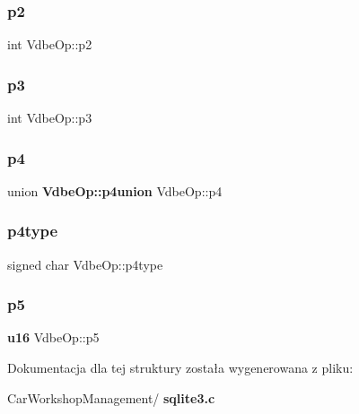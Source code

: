 \subsubsection{p2}
{\footnotesize\ttfamily int Vdbe\+Op\+::p2}

\mbox{\label{struct_vdbe_op_ad7ef3319da20d5423b8cc5da6995d193}} 
\subsubsection{p3}
{\footnotesize\ttfamily int Vdbe\+Op\+::p3}

\mbox{\label{struct_vdbe_op_a985bba6c3cd8e093d029e4462f8b4a59}} 
\subsubsection{p4}
{\footnotesize\ttfamily union \textbf{ Vdbe\+Op\+::p4union}  Vdbe\+Op\+::p4}

\mbox{\label{struct_vdbe_op_a124dee58d3e0d73c7dfaf811a3311023}} 
\subsubsection{p4type}
{\footnotesize\ttfamily signed char Vdbe\+Op\+::p4type}

\mbox{\label{struct_vdbe_op_a6262866780a8408c5f85b93117064fe3}} 
\subsubsection{p5}
{\footnotesize\ttfamily \textbf{ u16} Vdbe\+Op\+::p5}



Dokumentacja dla tej struktury została wygenerowana z pliku\+:\begin{DoxyCompactItemize}
\item 
Car\+Workshop\+Management/\textbf{ sqlite3.\+c}\end{DoxyCompactItemize}
